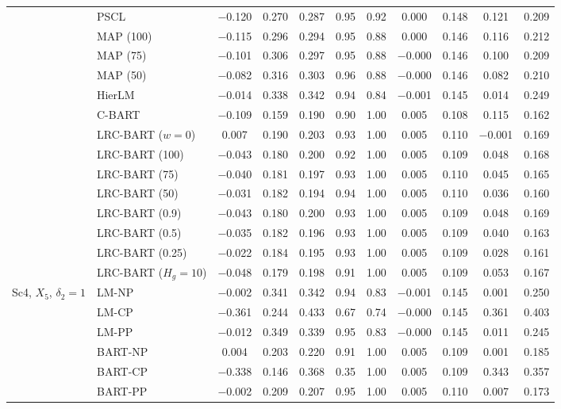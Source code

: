 \documentclass[11pt]{article}
\theoremstyle{definition}
\theoremstyle{plain}
\begin{document}
\begin{center}
\begin{longtable}{llccccccccc}
& PSCL & $-$0.120 & 0.270 & 0.287 & 0.95 & 0.92 & 0.000 & 0.148 & 0.121 & 0.209 \\
& MAP (100) & $-$0.115 & 0.296 & 0.294 & 0.95 & 0.88 & 0.000 & 0.146 & 0.116 & 0.212 \\
& MAP (75) & $-$0.101 & 0.306 & 0.297 & 0.95 & 0.88 & $-$0.000 & 0.146 & 0.100 & 0.209 \\
& MAP (50) & $-$0.082 & 0.316 & 0.303 & 0.96 & 0.88 & $-$0.000 & 0.146 & 0.082 & 0.210 \\
& HierLM & $-$0.014 & 0.338 & 0.342 & 0.94 & 0.84 & $-$0.001 & 0.145 & 0.014 & 0.249 \\
& C-BART & $-$0.109 & 0.159 & 0.190 & 0.90 & 1.00 & 0.005 & 0.108 & 0.115 & 0.162 \\
& LRC-BART ($w=0$) & 0.007 & 0.190 & 0.203 & 0.93 & 1.00 & 0.005 & 0.110 & $-$0.001 & 0.169 \\
& LRC-BART (100) & $-$0.043 & 0.180 & 0.200 & 0.92 & 1.00 & 0.005 & 0.109 & 0.048 & 0.168 \\
& LRC-BART (75) & $-$0.040 & 0.181 & 0.197 & 0.93 & 1.00 & 0.005 & 0.110 & 0.045 & 0.165 \\
& LRC-BART (50) & $-$0.031 & 0.182 & 0.194 & 0.94 & 1.00 & 0.005 & 0.110 & 0.036 & 0.160 \\
& LRC-BART (0.9) & $-$0.043 & 0.180 & 0.200 & 0.93 & 1.00 & 0.005 & 0.109 & 0.048 & 0.169 \\
& LRC-BART (0.5) & $-$0.035 & 0.182 & 0.196 & 0.93 & 1.00 & 0.005 & 0.109 & 0.040 & 0.163 \\
& LRC-BART (0.25) & $-$0.022 & 0.184 & 0.195 & 0.93 & 1.00 & 0.005 & 0.109 & 0.028 & 0.161 \\
& LRC-BART ($H_g=10$) & $-$0.048 & 0.179 & 0.198 & 0.91 & 1.00 & 0.005 & 0.109 & 0.053 & 0.167 \\
\midrule
\multirow{20}{*}{Sc4, $X_5$, $\delta_2=1$} & LM-NP & $-$0.002 & 0.341 & 0.342 & 0.94 & 0.83 & $-$0.001 & 0.145 & 0.001 & 0.250 \\
& LM-CP & $-$0.361 & 0.244 & 0.433 & 0.67 & 0.74 & $-$0.000 & 0.145 & 0.361 & 0.403 \\
& LM-PP & $-$0.012 & 0.349 & 0.339 & 0.95 & 0.83 & $-$0.000 & 0.145 & 0.011 & 0.245 \\
& BART-NP & 0.004 & 0.203 & 0.220 & 0.91 & 1.00 & 0.005 & 0.109 & 0.001 & 0.185 \\
& BART-CP & $-$0.338 & 0.146 & 0.368 & 0.35 & 1.00 & 0.005 & 0.109 & 0.343 & 0.357 \\
& BART-PP & $-$0.002 & 0.209 & 0.207 & 0.95 & 1.00 & 0.005 & 0.110 & 0.007 & 0.173 \\

\end{longtable}
\end{center}
\end{document}
